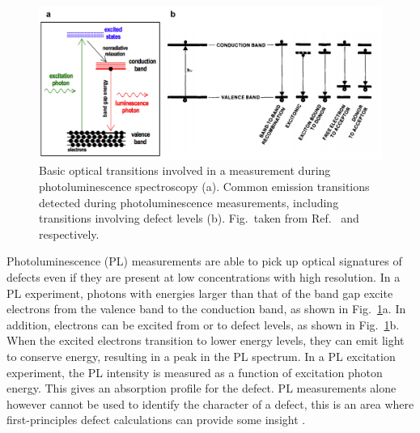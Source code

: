 \documentclass[11pt, twoside]{report}
\begin{document}
\begin{figure}[h!]
  \centering
    \includegraphics[width=1.0\textwidth]{figures/PL_transitions.png}
    \caption[Basic optical transitions involved in a measurement during photoluminescence spectroscopy (a). Common emission transitions detected during photoluminescence measurements, including transitions involving defect levels (b).]{Basic optical transitions involved in a measurement during photoluminescence spectroscopy (a). Common emission transitions detected during photoluminescence measurements, including transitions involving defect levels (b). Fig.~taken from Ref.~ and  respectively.}
  \label{PL_transitions}
\end{figure}

Photoluminescence (PL) measurements are able to pick up optical signatures of defects even if they are present at low concentrations with high resolution. 
In a PL experiment, photons with energies larger than that of the band gap excite electrons from the valence band to the conduction band, as shown in Fig.~\ref{PL_transitions}a. In addition, electrons can be excited from or to defect levels, as shown in Fig.~\ref{PL_transitions}b. When the excited electrons transition to lower energy levels, they can emit light to conserve energy, resulting in a peak in the PL spectrum. In a PL excitation experiment, the PL intensity is measured as a function of excitation photon energy. This gives an absorption profile for the defect.
PL measurements alone however cannot be used to identify the character of a defect, this is an area where first-principles defect calculations can provide some insight \cite{defects_tutorial}.
\end{document}
